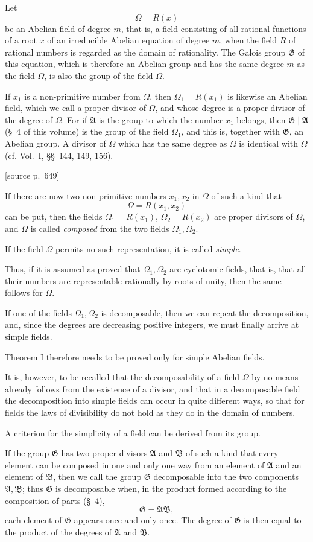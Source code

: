 \documentclass[11pt]{article}
\newcommand{\Om}{\Omega}
\newcommand{\Gg}{\mathfrak G}
\newcommand{\Aa}{\mathfrak A}
\newcommand{\Bb}{\mathfrak B}
\newcommand{\srcpage}[1]{\par\medskip\noindent\textsf{[source p.~#1]}\par\smallskip}
\begin{document}
Let
\[
  \Om=R(x)
\]
be an Abelian field of degree $m$, that is, a field consisting of all rational functions of a root $x$ of an irreducible Abelian equation of degree $m$, when the field $R$ of rational numbers is regarded as the domain of rationality. The Galois group $\Gg$ of this equation, which is therefore an Abelian group and has the same degree $m$ as the field $\Om$, is also the group of the field $\Om$.

If $x_1$ is a non-primitive number from $\Om$, then $\Om_1=R(x_1)$ is likewise an Abelian field, which we call a proper divisor of $\Om$, and whose degree is a proper divisor of the degree of $\Om$. For if $\Aa$ is the group to which the number $x_1$ belongs, then $\Gg\mid\Aa$ (\S~4 of this volume) is the group of the field $\Om_1$, and this is, together with $\Gg$, an Abelian group. A divisor of $\Om$ which has the same degree as $\Om$ is identical with $\Om$ (cf. Vol.~I, \S\S~144, 149, 156).

\srcpage{649}
If there are now two non-primitive numbers $x_1,x_2$ in $\Om$ of such a kind that
\[
  \Om=R(x_1,x_2)
\]
can be put, then the fields $\Om_1=R(x_1)$, $\Om_2=R(x_2)$ are proper divisors of $\Om$, and $\Om$ is called \emph{composed} from the two fields $\Om_1,\Om_2$.

If the field $\Om$ permits no such representation, it is called \emph{simple}.

Thus, if it is assumed as proved that $\Om_1,\Om_2$ are cyclotomic fields, that is, that all their numbers are representable rationally by roots of unity, then the same follows for $\Om$.

If one of the fields $\Om_1,\Om_2$ is decomposable, then we can repeat the decomposition, and, since the degrees are decreasing positive integers, we must finally arrive at simple fields.

Theorem I therefore needs to be proved only for simple Abelian fields.

It is, however, to be recalled that the decomposability of a field $\Om$ by no means already follows from the existence of a divisor, and that in a decomposable field the decomposition into simple fields can occur in quite different ways, so that for fields the laws of divisibility do not hold as they do in the domain of numbers.

A criterion for the simplicity of a field can be derived from its group.

If the group $\Gg$ has two proper divisors $\Aa$ and $\Bb$ of such a kind that every element can be composed in one and only one way from an element of $\Aa$ and an element of $\Bb$, then we call the group $\Gg$ decomposable into the two components $\Aa,\Bb$; thus $\Gg$ is decomposable when, in the product formed according to the composition of parts (\S~4),
\begin{equation}
  \Gg=\Aa\Bb,
\tag{1}
\end{equation}
each element of $\Gg$ appears once and only once. The degree of $\Gg$ is then equal to the product of the degrees of $\Aa$ and $\Bb$.
\end{document}
